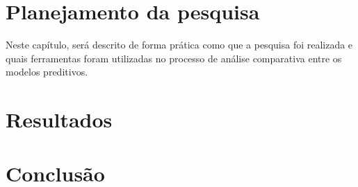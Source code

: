 \documentclass[
	12pt,				%
	openright,			%
	twoside,			%
	a4paper,			%
	english,			%
	french,				%
	spanish,			%
  japanese,
	brazil				%
	]{abntex2}
\begin{document}
\chapter{Planejamento da pesquisa}
Neste capítulo, será descrito de forma prática como que a pesquisa foi realizada e quais ferramentas foram utilizadas
no processo de análise comparativa entre os modelos preditivos. 


\chapter{Resultados}



\chapter{Conclusão}



\postextual



%
%



\end{document}
